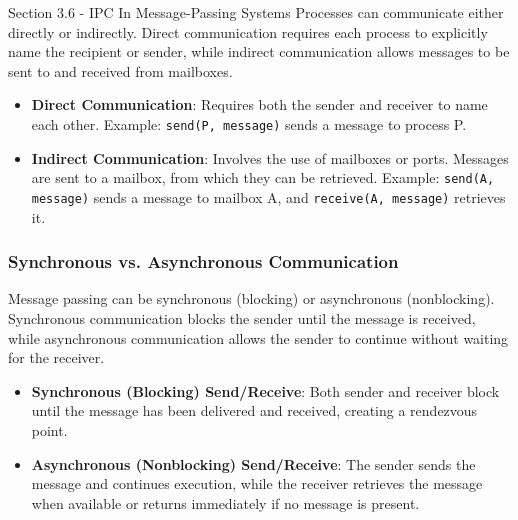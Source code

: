 \begin{notes}{Section 3.6 - IPC In Message-Passing Systems}
    Processes can communicate either directly or indirectly. Direct communication requires each process to explicitly name the recipient or sender, while indirect communication allows messages to be 
    sent to and received from mailboxes.
    
    \begin{highlight}
    
        \begin{itemize}
            \item \textbf{Direct Communication}: Requires both the sender and receiver to name each other. Example: \texttt{send(P, message)} sends a message to process P.
            \item \textbf{Indirect Communication}: Involves the use of mailboxes or ports. Messages are sent to a mailbox, from which they can be retrieved. Example: \texttt{send(A, message)} sends a 
            message to mailbox A, and \texttt{receive(A, message)} retrieves it.
        \end{itemize}
    
    \end{highlight}
    
    \subsubsection*{Synchronous vs. Asynchronous Communication}
    
    Message passing can be synchronous (blocking) or asynchronous (nonblocking). Synchronous communication blocks the sender until the message is received, while asynchronous communication allows the 
    sender to continue without waiting for the receiver.
    
    \begin{highlight}
    
        \begin{itemize}
            \item \textbf{Synchronous (Blocking) Send/Receive}: Both sender and receiver block until the message has been delivered and received, creating a rendezvous point.
            \item \textbf{Asynchronous (Nonblocking) Send/Receive}: The sender sends the message and continues execution, while the receiver retrieves the message when available or returns immediately 
            if no message is present.
        \end{itemize}
    

\end{highlight}
\end{notes}
